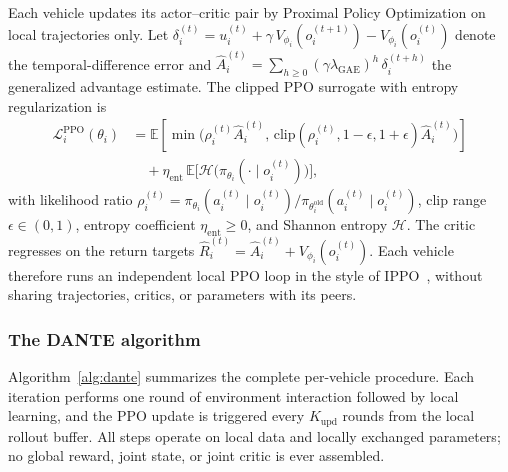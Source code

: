 Each vehicle updates its actor--critic pair by Proximal Policy Optimization on local trajectories only. Let $\delta_i^{(t)}=u_i^{(t)}+\gamma\,V_{\phi_i}(o_i^{(t+1)})-V_{\phi_i}(o_i^{(t)})$ denote the temporal-difference error and $\hat A_i^{(t)}=\sum_{h\ge 0}(\gamma\lambda_{\mathrm{GAE}})^h\,\delta_i^{(t+h)}$ the generalized advantage estimate. The clipped PPO surrogate with entropy regularization is
\begin{equation}
\label{eq:ppo}
\begin{split}
    \mathcal{L}_i^{\mathrm{PPO}}(\theta_i) &= \mathbb{E}\!\left[\min\!\bigl(\rho_i^{(t)}\hat A_i^{(t)},\,\mathrm{clip}(\rho_i^{(t)},1-\epsilon,1+\epsilon)\hat A_i^{(t)}\bigr)\right]\\
    &\quad + \eta_{\mathrm{ent}}\,\mathbb{E}\!\bigl[\mathcal{H}\bigl(\pi_{\theta_i}(\cdot\mid o_i^{(t)})\bigr)\bigr],
\end{split}
\end{equation}
with likelihood ratio $\rho_i^{(t)}=\pi_{\theta_i}(a_i^{(t)}\mid o_i^{(t)})/\pi_{\theta_i^{\mathrm{old}}}(a_i^{(t)}\mid o_i^{(t)})$, clip range $\epsilon\in(0,1)$, entropy coefficient $\eta_{\mathrm{ent}}\ge 0$, and Shannon entropy $\mathcal{H}$. The critic regresses on the return targets $\hat R_i^{(t)}=\hat A_i^{(t)}+V_{\phi_i}(o_i^{(t)})$. Each vehicle therefore runs an independent local PPO loop in the style of IPPO~\cite{dewitt2020independent}, without sharing trajectories, critics, or parameters with its peers.

\subsubsection{The DANTE algorithm}
\label{subsubsec:algo}

Algorithm~\ref{alg:dante} summarizes the complete per-vehicle procedure. Each iteration performs one round of environment interaction followed by local learning, and the PPO update is triggered every $K_{\mathrm{upd}}$ rounds from the local rollout buffer. All steps operate on local data and locally exchanged parameters; no global reward, joint state, or joint critic is ever assembled.

